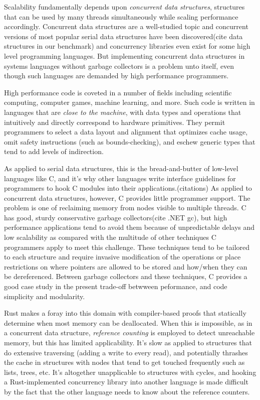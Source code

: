 Scalability fundamentally depends upon \textit{concurrent data structures}, structures that can be used by many threads simultaneously while scaling performance accordingly.  Concurrent data structures are a well-studied topic and concurrent versions of most popular serial data structures have been discovered\cite{Harris}(cite data structures in our benchmark) and concurrency libraries even exist for some high level programming languages.\cite{JavaUtilConcurrent}  But implementing concurrent data structures in systems languages without garbage collectors is a problem unto itself, even though such languages are demanded by high performance programmers.

High performance code is coveted in a number of fields including scientific computing, computer games, machine learning, and more.  Such code is written in languages that are \textit{close to the machine}, with data types and operations that intuitively and directly correspond to hardware primitives.\cite{Ritchie}  They permit programmers to select a data layout and alignment that optimizes cache usage, omit safety instructions (such as bounds-checking), and eschew generic types that tend to add levels of indirection.

As applied to serial data structures, this is the bread-and-butter of low-level languages like C, and it's why other languages write interface guidelines for programmers to hook C modules into their applications.(citations)  As applied to concurrent data structures, however, C provides little programmer support.  The problem is one of reclaiming memory from nodes visible to multiple threads.  C has good, sturdy conservative garbage collectors\cite{BDW}(cite .NET gc), but high performance applications tend to avoid them because of unpredictable delays and low scalability as compared with the multitude of other techniques C programmers apply to meet this challenge.  These techniques tend to be tailored to each structure and require invasive modification of the operations or place restrictions on where pointers are allowed to be stored and how/when they can be dereferenced.\cite{HP}\cite{DTA}\cite{StackTrack}\cite{Threadscan}  Between garbage collectors and these techniques, C provides a good case study in the present trade-off betwween peformance, and code simplicity and modularity.

Rust\cite{Rust} makes a foray into this domain with compiler-based proofs that statically determine when most memory can be deallocated.  When this is impossible, as in a concurrent data structure, \textit{reference counting} is employed to detect unreachable memory, but this has limited applicability.  It's slow as applied to structures that do extensive traversing (adding a write to every read), and potentially thrashes the cache in structures with nodes that tend to get touched frequently such as lists, trees, etc.  It's altogether unapplicable to structures with cycles, and hooking a Rust-implemented concurrency library into another language is made difficult by the fact that the other language needs to know about the reference counters.

